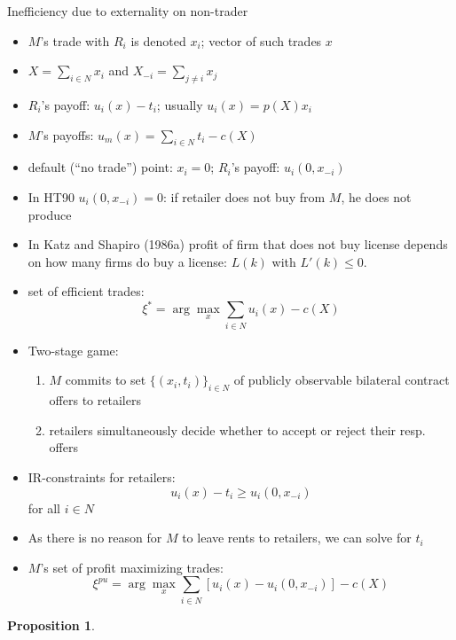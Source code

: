 \documentclass[11pt,english]{beamer}
\newtheorem{proposition}{Proposition}
\begin{document}
\begin{frame}[allowframebreaks]{Inefficiency due to externality on non-trader}
  \begin{itemize}
  \item $M$'s trade with $R_i$ is denoted $x_i$; vector of such trades $x$
  \item $X=\sum_{i \in N} x_i$ and $X_{-i} = \sum_{j \neq i} x_j$
  \item $R_i$'s payoff: $u_i(x)-t_i$; usually $u_i(x)= p(X)x_i$
  \item $M$'s payoffs: $u_m(x) = \sum_{i \in N} t_i -c(X)$
  \item default (``no trade'') point: $x_i=0$; $R_i$'s payoff: $u_i(0,x_{-i})$
  \item In HT90 $u_i(0,x_{-i})=0$: if retailer does not buy from $M$,
    he does not produce
  \item In Katz and Shapiro (1986a) profit of firm that does not buy
    license depends on how many firms do buy a license: $L(k)$ with
    $L'(k) \leq 0$.
  \item set of efficient trades:
    \begin{equation}
      \label{eq:S99EfficientTrades}
      \xi^* = \arg\max_x \sum_{i \in N} u_i(x)-c(X)
    \end{equation}
  \item Two-stage game:
    \begin{enumerate}
    \item $M$ commits to set $\{(x_i,t_i)\}_{i \in N}$ of publicly
      observable bilateral contract offers to retailers
    \item retailers simultaneously decide whether to accept or reject
      their resp. offers
    \end{enumerate}
  \item IR-constraints for retailers:
    \begin{equation}
      \label{eq:S99IR}
      u_i(x)-t_i \geq u_i(0,x_{-i})
    \end{equation}
    for all $i \in N$
  \item As there is no reason for $M$ to leave rents to retailers, we can
    solve for $t_i$
  \item $M$'s set of profit maximizing trades:
    \begin{equation}
      \label{eq:S99ProfitTrades}
      \xi^{pu} = \arg\max_x \sum_{i \in N} [u_i(x)-u_i(0,x_{-i})] -c(X)
    \end{equation}
  \end{itemize}
  \begin{proposition}

\end{proposition}
\end{frame}
\end{document}

